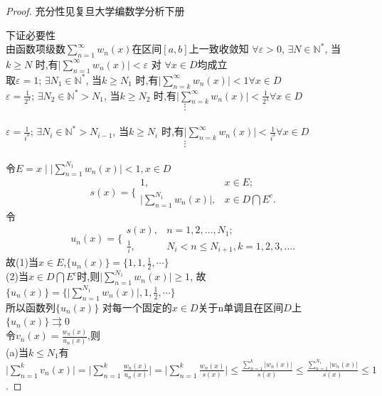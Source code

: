 \documentclass[a4paper,12pt,twoside]{ctexart}
\begin{document}
 \begin{proof}
    充分性见复旦大学编数学分析下册

    下证必要性\\
    由函数项级数$\sum\limits_{n=1}^{\infty}{w_n(x)}$在区间$[a,b]$上一致收敛知
    $\forall\varepsilon>0$, $\exists  N\in\mathbb{ N^{*}}$, 当$k\geq N$ 时,有${\vert{\sum\limits_{n=1}^{\infty}{w_n(x)}}\vert}<\varepsilon$ 对 $\forall x\in D$均成立\\
取$\varepsilon=1$; $\exists  N_1\in\mathbb{ N^{*}}$, 当$k\geq N_1$ 时,有${\vert{\sum\limits_{n=k}^{\infty}{w_n(x)}}\vert}<1$\qquad$\forall x\in D$\\
$\varepsilon=\frac{1}{2^3}$; $\exists  N_2\in\mathbb{ N^{*}}>N_{1}$, 当$k\geq N_2$ 时,有${\vert{\sum\limits_{n=k}^{\infty}{w_n(x)}}\vert}<\frac{1}{2^3}$\qquad$\forall x\in D$\\
$$\vdots$$\\
$\varepsilon=\frac{1}{i^3}$; $\exists  N_i\in\mathbb{ N^{*}}>N_{i-1}$, 当$k\geq N_i$ 时,有${\vert{\sum\limits_{n=k}^{\infty}{w_n(x)}}\vert}<\frac{1}{i^3}$\qquad$\forall x\in D$\\
$$\vdots$$\\
令$E={x\mid{\vert{\sum\limits_{n=1}^{N_1}{w_n(x)}}\vert<1},x\in D}$\\
$$
{s(x)}=\bigg\{\!\!\!
    \begin{array}{ll}
    1,&x\in E;\\[-15pt]
    \vert{\sum\limits_{n=1}^{N_1}{w_n(x)}}\vert,&x\in{D\bigcap E^c}.
    \end{array}
$$
令
$$
{u_n(x)}=\bigg\{\!\!\!
    \begin{array}{ll}
    s(x),&n=1,2,\ldots,N_1;\\[-15pt]
    \frac{1}{i},&N_i<n\leq N_{i+1}, k=1,2,3,\dots.
    \end{array}
$$
故(1)当$x\in E$,$\{u_n(x)\}=\{1,1,\frac{1}{2},\cdots\}$\\
(2)当$x\in{D\bigcap E^c}$时,则$\vert{\sum\limits_{n=1}^{N_1}{w_n(x)}}\vert\geq 1$, 故$\{u_n(x)\}=\{\vert{\sum\limits_{n=1}^{N_1}{w_n(x)}}\vert,1,\frac{1}{2},\cdots\}$\\
所以函数列$\{u_n(x)\}$ 对每一个固定的$x\in D$关于n单调且在区间$D$上$\{u_n(x)\}\rightrightarrows0$\\
令$v_n(x)=\frac{w_n(x)}{u_n(x)}$,则\\
(a)当$k\leq N_1$有
$\vert\sum_{n=1}^kv_n(x)\vert=\vert\sum_{n=1}^k\frac{w_n(x)}{u_n(x)}\vert=
\vert\sum_{n=1}^k\frac{w_n(x)}{s(x)}\vert
\le\frac{\sum_{n=1}^k\vert w_n(x)\vert}{s(x)}
\le\frac{\sum_{n=1}^{N_1}\vert w_n(x)\vert}{s(x)}\le 1$.


\end{proof}
\end{document}
